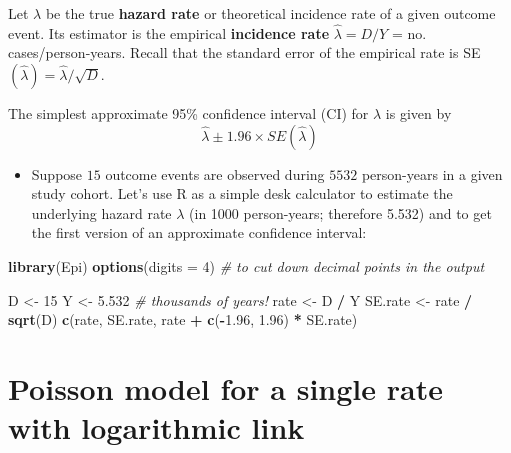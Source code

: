 \documentclass[
]{book}
\newenvironment{Shaded}{\begin{snugshade}}{\end{snugshade}}
\newcommand{\AttributeTok}[1]{\textcolor[rgb]{0.13,0.29,0.53}{#1}}
\newcommand{\CommentTok}[1]{\textcolor[rgb]{0.56,0.35,0.01}{\textit{#1}}}
\newcommand{\DecValTok}[1]{\textcolor[rgb]{0.00,0.00,0.81}{#1}}
\newcommand{\FloatTok}[1]{\textcolor[rgb]{0.00,0.00,0.81}{#1}}
\newcommand{\FunctionTok}[1]{\textcolor[rgb]{0.13,0.29,0.53}{\textbf{#1}}}
\newcommand{\NormalTok}[1]{#1}
\newcommand{\OtherTok}[1]{\textcolor[rgb]{0.56,0.35,0.01}{#1}}
\newcommand{\SpecialCharTok}[1]{\textcolor[rgb]{0.81,0.36,0.00}{\textbf{#1}}}
\providecommand{\tightlist}{%
  \setlength{\itemsep}{0pt}\setlength{\parskip}{0pt}}
\begin{document}
Let \(\lambda\) be the true \textbf{hazard rate} or theoretical incidence rate of a given outcome event.
Its estimator is the empirical \textbf{incidence rate}
\(\widehat\lambda = D/Y\) = no. cases/person-years. Recall that the
standard error of the empirical rate is
SE\((\widehat\lambda) = \widehat\lambda/\sqrt{D}\).

The simplest approximate 95\% confidence interval (CI) for \(\lambda\)
is given by
\[ \widehat\lambda \pm 1.96 \times SE(\widehat\lambda) \]

\begin{itemize}
\tightlist
\item
  Suppose \(15\) outcome events are observed during \(5532\) person-years in a given study cohort.
  Let's use R as a simple desk calculator to estimate the underlying hazard rate \(\lambda\) (in 1000
  person-years; therefore 5.532) and to get the first version of an approximate confidence
  interval:
\end{itemize}

\begin{Shaded}
\begin{Highlighting}[]
\FunctionTok{library}\NormalTok{(Epi)}
\FunctionTok{options}\NormalTok{(}\AttributeTok{digits =} \DecValTok{4}\NormalTok{) }\CommentTok{\#  to cut down decimal points in the output}
\end{Highlighting}
\end{Shaded}

\begin{Shaded}
\begin{Highlighting}[]
\NormalTok{D }\OtherTok{\textless{}{-}} \DecValTok{15}
\NormalTok{Y }\OtherTok{\textless{}{-}} \FloatTok{5.532} \CommentTok{\# thousands of years!}
\NormalTok{rate }\OtherTok{\textless{}{-}}\NormalTok{ D }\SpecialCharTok{/}\NormalTok{ Y}
\NormalTok{SE.rate }\OtherTok{\textless{}{-}}\NormalTok{ rate }\SpecialCharTok{/} \FunctionTok{sqrt}\NormalTok{(D)}
\FunctionTok{c}\NormalTok{(rate, SE.rate, rate }\SpecialCharTok{+} \FunctionTok{c}\NormalTok{(}\SpecialCharTok{{-}}\FloatTok{1.96}\NormalTok{, }\FloatTok{1.96}\NormalTok{) }\SpecialCharTok{*}\NormalTok{ SE.rate)}
\end{Highlighting}
\end{Shaded}

\section{Poisson model for a single rate with logarithmic link}\label{poisson-model-for-a-single-rate-with-logarithmic-link}
\end{document}
